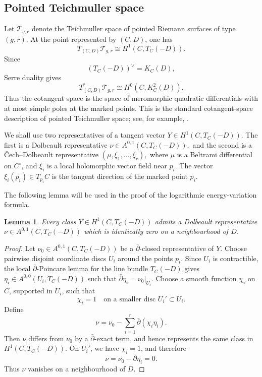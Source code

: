 \documentclass[10pt,a4paper]{amsart}
\numberwithin{equation}{section}
\newtheorem{lemma}[theorem]{Lemma}
\begin{document}
\subsection{Pointed Teichmuller space}

Let \(\mathcal T_{g,r}\) denote the Teichmuller space of pointed Riemann
surfaces of type \((g,r)\).  At the point represented by \((C,D)\), one has
\[
        T_{(C,D)}\mathcal T_{g,r}
        \cong
        H^1(C,T_C(-D)).
\]
Since
\[
        (T_C(-D))^\vee=K_C(D),
\]
Serre duality gives
\[
        T^*_{(C,D)}\mathcal T_{g,r}
        \cong
        H^0(C,K_C^2(D)).
\]
Thus the cotangent space is the space of meromorphic quadratic differentials
with at most simple poles at the marked points.
This is the standard cotangent-space description of pointed Teichmuller space;
see, for example, \cite{Gardiner,Hubbard}.

We shall use two representatives of a tangent vector
\(
        Y\in H^1(C,T_C(-D)).
\)
The first is a Dolbeault representative
\(
        \nu\in A^{0,1}(C,T_C(-D)),
\)
and the second is a \v{C}ech--Dolbeault representative
\(
        (\mu,\xi_1,\ldots,\xi_r),
\)
where \(\mu\) is a Beltrami differential on \(C^\circ\), and \(\xi_i\) is a
local holomorphic vector field near \(p_i\).  The vector
\(
        \xi_i(p_i)\in T_{p_i}C
\)
is the tangent direction of the marked point \(p_i\).

The following lemma will be used in the proof of the logarithmic energy-variation
formula.

\begin{lemma}
\label{lem:vanishing-representative}
Every class
\(
        Y\in H^1(C,T_C(-D))
\)
admits a Dolbeault representative
\(
        \nu\in A^{0,1}(C,T_C(-D))
\)
which is identically zero on a neighbourhood of \(D\).
\end{lemma}

\begin{proof}
Let
\(
        \nu_0\in A^{0,1}(C,T_C(-D))
\)
be a \(\bar\partial\)-closed representative of \(Y\). Choose pairwise disjoint
coordinate discs \(U_i\) around the points \(p_i\). Since \(U_i\) is
contractible, the local \(\bar\partial\)-Poincare lemma for the line bundle
\(T_C(-D)\) gives
\(
        \eta_i\in A^{0,0}(U_i,T_C(-D))
\)
such that
\(
        \bar\partial\eta_i=\nu_0|_{U_i}.
\)
Choose a smooth function \(\chi_i\) on \(C\), supported in \(U_i\), such that
\[
        \chi_i=1
        \quad\text{on a smaller disc }U_i'\subset U_i.
\] Define
\[
        \nu
        =
        \nu_0-\sum_{i=1}^{r}\bar\partial(\chi_i\eta_i).
\]
Then \(\nu\) differs from \(\nu_0\) by a \(\bar\partial\)-exact term, and hence
represents the same class in \(H^1(C,T_C(-D))\).  On \(U_i'\), we have
\(\chi_i=1\), and therefore
\[
        \nu
        =
        \nu_0-\bar\partial\eta_i
        =
        0.
\]
Thus \(\nu\) vanishes on a neighbourhood of \(D\).
\end{proof}
\end{document}
